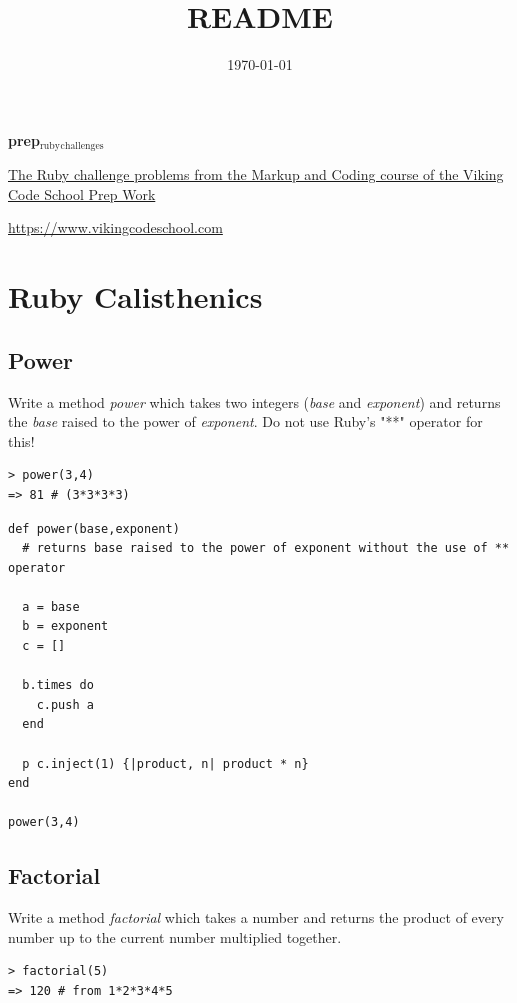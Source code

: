 \documentclass[11pt]{article}
\date{\today}
\title{README}
\begin{document}
\maketitle
\textbf{prep$_{\text{ruby}}$$_{\text{challenges}}$}

\href{http://www.vikingcodeschool.com/web-markup-and-coding/level-up-your-ruby-judo}{The Ruby challenge problems from the Markup and Coding course of the Viking Code School Prep Work}

\url{https://www.vikingcodeschool.com}

\section{Ruby Calisthenics}
\label{sec-1}

\subsection{Power}
\label{sec-1-1}

Write a method \emph{power} which takes two integers (\emph{base} and \emph{exponent}) and 
returns the \emph{base} raised to the power of \emph{exponent}. Do not use Ruby's "**"
operator for this!

\begin{verbatim}
> power(3,4)
=> 81 # (3*3*3*3)
\end{verbatim}

\begin{verbatim}
def power(base,exponent)
  # returns base raised to the power of exponent without the use of ** operator

  a = base
  b = exponent
  c = []

  b.times do
    c.push a
  end

  p c.inject(1) {|product, n| product * n}
end

power(3,4)
\end{verbatim}

\subsection{Factorial}
\label{sec-1-2}

Write a method \emph{factorial} which takes a number and returns the product of 
every number up to the current number multiplied together.

\begin{verbatim}
> factorial(5)
=> 120 # from 1*2*3*4*5
\end{verbatim}
\end{document}
